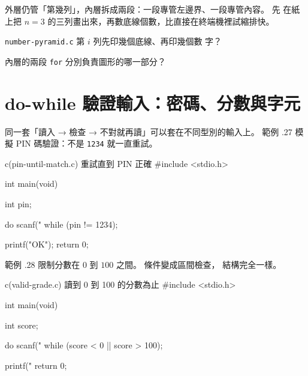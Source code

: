 
外層仍管「第幾列」，內層拆成兩段：一段專管左邊界、一段專管內容。 先
在紙上把 $n=3$ 的三列畫出來，再數底線個數，比直接在終端機裡試縮排快。

\begin{drills}[label=drills:loop-pyramid]
\item \texttt{number-pyramid.c} 第 $i$ 列先印幾個底線、再印幾個數
字？
\item 內層的兩段 \texttt{for} 分別負責圖形的哪一部分？
\end{drills}

\section{do-while 驗證輸入：密碼、分數與字元}
\label{sec:loop-input-validation}

同一套「讀入 → 檢查 → 不對就再讀」可以套在不同型別的輸入上。 範例
\thechapter.27 模擬 PIN 碼驗證：不是 \texttt{1234} 就一直重試。

\begin{example}{c}{(pin-until-match.c) 重試直到 PIN 正確}
#include <stdio.h>

int main(void) {
    int pin;

    do {
        scanf("%
    } while (pin != 1234);

    printf("OK\n");
    return 0;
}
\end{example}


範例 \thechapter.28 限制分數在 $0$ 到 $100$ 之間。 條件變成區間檢查，
結構完全一樣。

\begin{example}{c}{(valid-grade.c) 讀到 0 到 100 的分數為止}
#include <stdio.h>

int main(void) {
    int score;

    do {
        scanf("%
    } while (score < 0 || score > 100);

    printf("%
    return 0;
}
\end{example}



